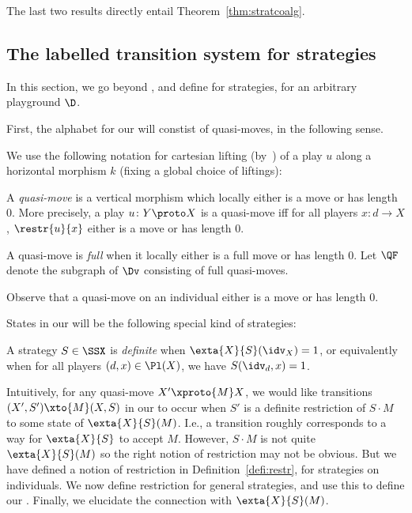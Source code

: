 \documentclass{LMCS}
\theoremstyle{plain}\newtheorem{satz}[thm]{Satz}
\begin{document}
The last two results directly entail Theorem~\ref{thm:stratcoalg}.


\subsection{The labelled transition system for strategies}\label{subsec:lts:strats}
In this section, we go beyond , and
define \anlts{} for strategies, for an arbitrary playground $\D$. 

First, the alphabet for our \lts{} will constist of quasi-moves, in the following sense.
\begin{notation}\label{not:cartesian}
  We use the following notation for cartesian lifting
  (by~) of a play $u$ along a horizontal morphism
  $k$ (fixing a global choice of liftings):
  \begin{center}
  \end{center}
\end{notation}
\begin{defi}\label{def:quasi-move}
  A \emph{quasi-move} is a vertical morphism which locally either is a
  move or has length 0.  More precisely, a play $u \colon Y \proto X$ is
  a quasi-move iff for all players $x \colon d \to X$, $\restr{u}{x}$
  either is a move or has length 0.

  A quasi-move is \emph{full} when it locally either is a full move
  or has length 0. Let $\QF$ denote the subgraph of $\Dv$ consisting
  of full quasi-moves.
\end{defi}
Observe that a quasi-move on an individual either is a move or has
length 0.

States in our \lts{} will be the following special kind of strategies:
\begin{defi}
  A strategy $S \in \SSX$ is \emph{definite} when $\exta{X}{S}(\idv_X)
  = 1$, or equivalently when for all players $(d,x) \in \Pl (X)$,
  we have $S(\idv_d,x) = 1$.
\end{defi}

Intuitively, for any quasi-move $X' \xproto{M} X$, we would like
transitions $(X',S') \xto{M} (X,S)$ in our \lts{} to occur when $S'$
is a definite restriction of $S \cdot M$ to some state of
$\exta{X}{S}(M)$.  I.e., a transition roughly corresponds to a way for
$\exta{X}{S}$ to accept $M$.  However, $S \cdot M$ is not quite
$\exta{X}{S}(M)$ so the right notion of restriction may not be
obvious. But we have defined a notion of restriction in
Definition~\ref{defi:restr}, for strategies on individuals.  We now
define restriction for general strategies, and use this to define our
\lts{}. Finally, we elucidate the connection with $\exta{X}{S}(M)$.
\end{document}
